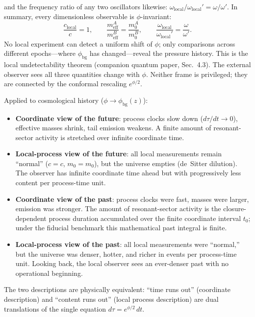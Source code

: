 \documentclass[11pt]{article}
\begin{document}
and the frequency ratio of any two oscillators likewise:
$\omega_{\mathrm{local}}/\omega_{\mathrm{local}}'
= \omega/\omega'$.
In summary, every dimensionless observable is $\phi$-invariant:
\begin{equation}\label{eq:local_undet_app18}
  \frac{c_{\mathrm{local}}}{c} = 1,\qquad
  \frac{m_{\mathrm{eff}}^A}{m_{\mathrm{eff}}^B}
    = \frac{m_0^A}{m_0^B},\qquad
  \frac{\omega_{\mathrm{local}}}{\omega_{\mathrm{local}}'}
    = \frac{\omega}{\omega'}.
\end{equation}
No local experiment can detect a uniform shift of $\phi$;
only comparisons across different epochs---where
$\phi_{\mathrm{bg}}$ has changed---reveal the pressure history.
This is the local undetectability theorem
(companion quantum paper, Sec.~4.3).
The external observer sees all three quantities change with $\phi$.
Neither frame is privileged; they are connected by the conformal
rescaling $e^{\phi/2}$.

\noindent Applied to cosmological history ($\phi\to\phi_{\mathrm{bg}}(z)$):
\begin{itemize}
\item \textbf{Coordinate view of the future}: process clocks slow down
  ($d\tau/dt \to 0$), effective masses shrink, tail emission weakens.
  A finite amount of resonant-sector activity is stretched over infinite
  coordinate time.
\item \textbf{Local-process view of the future}: all local measurements
  remain ``normal'' ($c=c$, $m_0=m_0$), but the universe empties
  (de~Sitter dilution).  The observer has infinite coordinate time
  ahead but with progressively less content per process-time unit.
\item \textbf{Coordinate view of the past}: process clocks were fast,
  masses were larger, emission was stronger.  The amount of
  resonant-sector activity is the closure-dependent process duration
  accumulated over the finite coordinate interval $t_0$; under the
  fiducial benchmark this mathematical past integral is finite.
\item \textbf{Local-process view of the past}: all local measurements were
  ``normal,'' but the universe was denser, hotter, and richer in
  events per process-time unit.  Looking back, the local observer
  sees an ever-denser past with no operational beginning.
\end{itemize}
The two descriptions are physically equivalent: ``time runs out''
(coordinate description) and ``content runs out'' (local process description) are dual
translations of the single equation $d\tau = e^{\phi/2}\,dt$.
\end{document}
